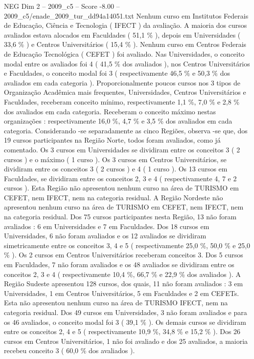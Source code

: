 \begin{textsample}{NEG Dim 2 – 2009\_c5 – Score -8.00 – 2009\_c5/enade\_2009\_tur\_dd94a14051.txt}
Nenhum curso em Institutos Federais de Educação, Ciência e Tecnologia ( IFECT ) da avaliação.
A maioria dos cursos avaliados estava alocados em Faculdades ( 51,1 \% ), depois em Universidades ( 33,6 \% ) e Centros Universitários ( 15,4 \% ).
Nenhum curso em Centros Federais de Educação Tecnológica ( CEFET ) foi avaliado.
Nas Universidades, o conceito modal entre os avaliados foi 4 ( 41,5 \% dos avaliados ), nos Centros Universitários e Faculdades, o conceito modal foi 3 ( respectivamente 46,5 \% e 50,3 \% dos avaliados em cada categoria ).
Proporcionalmente poucos cursos nos 3 tipos de Organização Acadêmica mais frequentes, Universidades, Centros Universitários e Faculdades, receberam conceito mínimo, respectivamente 1,1 \%, 7,0 \% e 2,8 \% dos avaliados em cada categoria.
Receberam o conceito máximo nestas organizações : respectivamente 16,0 \%, 4,7 \% e 3,5 \% dos avaliados em cada categoria.
Considerando -se separadamente as cinco Regiões, observa -se que, dos 19 cursos participantes na Região Norte, todos foram avaliados, como já comentado.
Os 3 cursos em Universidades se dividiram entre os conceitos 3 ( 2 cursos ) e o máximo ( 1 curso ).
Os 3 cursos em Centros Universitários, se dividiram entre os conceitos 3 ( 2 cursos ) e 4 ( 1 curso ).
Os 13 cursos em Faculdades, se dividiram entre os conceitos 2, 3 e 4 ( respectivamente 4, 7 e 2 cursos ).
Esta Região não apresentou nenhum curso na área de TURISMO em CEFET, nem IFECT, nem na categoria residual.
A Região Nordeste não apresentou nenhum curso na área de TURISMO em CEFET, nem IFECT, nem na categoria residual.
Dos 75 cursos participantes nesta Região, 13 não foram avaliados : 6 em Universidades e 7 em Faculdades.
Dos 18 cursos em Universidades, 6 não foram avaliados e os 12 avaliados se dividiram simetricamente entre os conceitos 3, 4 e 5 ( respectivamente 25,0 \%, 50,0 \% e 25,0 \% ).
Os 2 cursos em Centros Universitários receberam conceitos 3.
Dos 5 cursos em Faculdades, 7 não foram avaliados e os 48 avaliados se dividiram entre os conceitos 2, 3 e 4 ( respectivamente 10,4 \%, 66,7 \% e 22,9 \% dos avaliados ).
A Região Sudeste apresentou 128 cursos, dos quais, 11 não foram avaliados : 3 em Universidades, 1 em Centros Universitários, 5 em Faculdades e 2 em CEFETs.
Esta não apresentou nenhum curso na área de TURISMO IFECT, nem na categoria residual.
Dos 49 cursos em Universidades, 3 não foram avaliados e para os 46 avaliados, o conceito modal foi 3 ( 39,1 \% ).
Os demais cursos se dividiram entre os conceitos 2, 4 e 5 ( respectivamente 10,9 \%, 34,8 \% e 15,2 \% ).
Dos 26 cursos em Centros Universitários, 1 não foi avaliado e dos 25 avaliados, a maioria recebeu conceito 3 ( 60,0 \% dos avaliados ).

\end{textsample}
